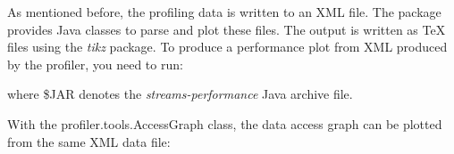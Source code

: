 \documentclass[german,a4]{scrartcl}
\begin{document}
As mentioned before, the profiling data is written to an XML file. The package provides Java classes
to parse and plot these files. The output is written as TeX files using the {\em tikz} package. To
produce a performance plot from XML produced by the profiler, you need to run:
\begin{center}
\end{center}
where {\ttfamily \$JAR} denotes the {\em streams-performance} Java archive file.

With the {\ttfamily profiler.tools.AccessGraph} class, the data access graph can be plotted from the
same XML data file:
\begin{center}
\end{center}
\end{document}
